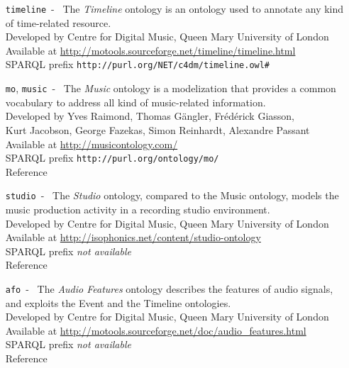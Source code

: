 \documentclass[11pt, twoside, openright]{report}   	%
\begin{document}
\begin{enumerate}
\item[\texttt{timeline}~-~] The \textit{Timeline} ontology is an ontology used to annotate any kind of time-related resource. \\
Developed by \hfill Centre for Digital Music, Queen Mary University of London \\
Available at \hfill \url{http://motools.sourceforge.net/timeline/timeline.html} \\
SPARQL prefix \hfill \texttt{http://purl.org/NET/c4dm/timeline.owl\#}

\item[\texttt{mo}, \texttt{music}~-~] The \textit{Music} ontology is a modelization that provides a common vocabulary to address all kind of music-related information. \\
Developed by \hfill     Yves Raimond, Thomas Gängler, Frédérick Giasson,\\
\null \hfill Kurt Jacobson, George Fazekas, Simon Reinhardt, Alexandre Passant \\
Available at \hfill \url{http://musicontology.com/}\\
SPARQL prefix \hfill \texttt{http://purl.org/ontology/mo/}\\
Reference \hfill \cite{raimond2007music, raimond2010spec}

\item[\texttt{studio}~-~] The \textit{Studio} ontology, compared to the Music ontology, models the music production activity in a recording studio environment. \\
Developed by \hfill Centre for Digital Music, Queen Mary University of London \\
Available at \hfill  \url{http://isophonics.net/content/studio-ontology}\\
SPARQL prefix \hfill \textit{not available}\\
Reference \hfill \cite{fazekas2011studio}

\item[\texttt{afo}~-~] The \textit{Audio Features} ontology describes the features of audio signals, and exploits the Event and the Timeline ontologies. \\
Developed by \hfill Centre for Digital Music, Queen Mary University of London \\
Available at \hfill  \url{http://motools.sourceforge.net/doc/audio_features.html}\\
SPARQL prefix \hfill \textit{not available}\\
Reference \hfill \cite{allik2016ontology}


\end{enumerate}
\end{document}

